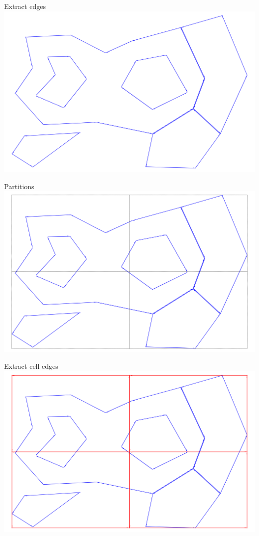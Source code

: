 \documentclass{beamer}
\begin{document}
\begin{frame}{Extract edges}
    \centering 
    \includegraphics[width=0.8\linewidth]{figures/EP02}     
\end{frame}

\begin{frame}{Partitions}
    \centering 
    \includegraphics[width=0.8\linewidth]{figures/EP03}     
\end{frame}

\begin{frame}{Extract cell edges}
    \centering 
    \includegraphics[width=0.8\linewidth]{figures/EP04}     
\end{frame}
\end{document}
